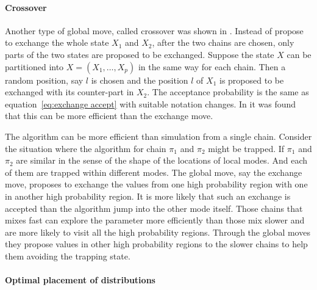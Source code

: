 \paragraph{Crossover}

Another type of global move, called crossover was shown in
\cite{Liang:2001dc}. Instead of propose to exchange the whole state $X_1$ and
$X_2$, after the two chains are chosen, only parts of the two states are
proposed to be exchanged. Suppose the state $X$ can be partitioned into $X =
(X_1,\dots,X_p)$ in the same way for each chain. Then a random position, say
$l$ is chosen and the position $l$ of $X_1$ is proposed to be exchanged with
its counter-part in $X_2$. The acceptance probability is the same as
equation~\eqref{eq:exchange accept} with suitable notation changes. In
\cite{Jasra:2007in} it was found that this can be more efficient than the
exchange move.

The algorithm can be more efficient than simulation from a single chain.
Consider the situation where the \mcmc algorithm for chain $\pi_1$ and $\pi_2$
might be trapped. If $\pi_1$ and $\pi_2$ are similar in the sense of the shape
of the locations of local modes. And each of them are trapped within different
modes. The global move, say the exchange move, proposes to exchange the values
from one high probability region with one in another high probability region.
It is more likely that such an exchange is accepted than the \mcmc algorithm
jump into the other mode itself. Those chains that mixes fast can explore the
parameter more efficiently than those mix slower and are more likely to visit
all the high probability regions. Through the global moves they propose values
in other high probability regions to the slower chains to help them avoiding
the trapping state.

\paragraph{Optimal placement of distributions}

